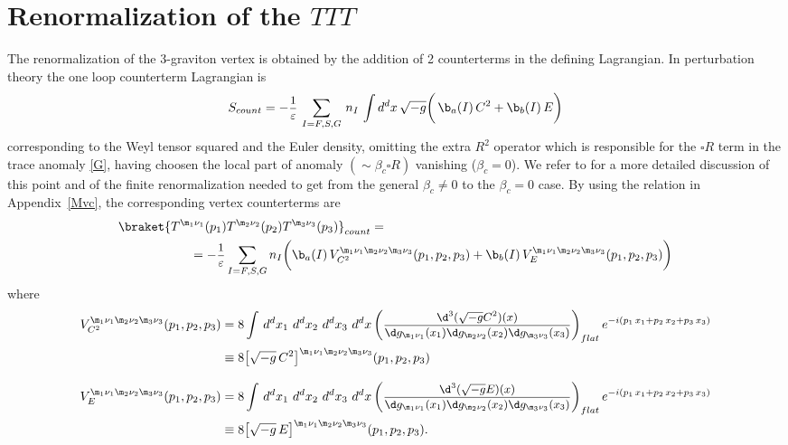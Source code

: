 \documentclass[a4paper,11pt,openright,twoside]{book}
\let\n=\nu      \let\x=\xi     \let\p=\pi      \let\r=\rho
\newcommand{\sdfrac}[2]{\mbox{\small$\displaystyle\frac{#1}{#2}$}}
\newcommand{\appref}[1]{Appendix~\ref{#1}}		%
\numberwithin{equation}{section}
\begin{document}
{{\section{Renormalization of the $TTT$}
\label{renorm}
The renormalization of the 3-graviton vertex is obtained by the addition of 2 counterterms in the defining Lagrangian. In perturbation theory the one loop counterterm Lagrangian is
\begin{equation}
	S_{count}=-\sdfrac{1}{\varepsilon}\,\sum_{I=F,S,G}\,n_I\,\int d^dx\,\sqrt{-g}\bigg(\,\b_a(I)\,C^2+\b_b(I)\,E\bigg)
	\label{scount}
\end{equation}
corresponding to the Weyl tensor squared and the Euler density, omitting the extra 
$R^2$ operator which is responsible for the $\square R$ term in the trace anomaly \eqref{G}, having choosen the local part of anomaly 
$(\sim \beta_c\square R)$ vanishing ($\beta_c=0$). We refer to \cite{Coriano:2012wp} for a more detailed discussion of this point and of the finite renormalization needed to get from the general $\beta_c\neq 0$ to the $\beta_c=0$ case. By using the relation in \appref{Mvc}, the corresponding vertex counterterms are
\begin{align}
	&\braket{T^{\m_1\n_1}(p_1)T^{\m_2\n_2}(p_2)T^{\m_3\n_3}(p_3)}_{count}=\notag\\
	&\hspace{2cm}=-\sdfrac{1}{\varepsilon}\sum_{I=F,S,G}n_I\bigg(\b_a(I)\,V_{C^2}^{\m_1\n_1\m_2\n_2\m_3\n_3}(p_1,p_2,p_3)+\b_b(I)\,V_{E}^{\m_1\n_1\m_2\n_2\m_3\n_3}(p_1,p_2,p_3)\bigg)
\end{align} 
where
\begin{align}
	V_{C^2}^{\m_1\n_1\m_2\n_2\m_3\n_3}(p_1,p_2,p_3)&=8\int\,d^dx_1\,\,d^dx_2\,\,d^dx_3\,\,d^dx\,\bigg(\sdfrac{\d^3(\sqrt{-g}C^2)(x)}{\d g_{\m_1\n_1}(x_1)\d g_{\m_2\n_2}(x_2)\d g_{\m_3\n_3}(x_3)}\bigg)_{flat}\,e^{-i(p_1\,x_1+p_2\,x_2+p_3\,x_3)}\notag\\
	&\equiv 8\big[\sqrt{-g}\,C^2\big]^{\m_1\n_1\m_2\n_2\m_3\n_3}(p_1,p_2,p_3)\\[2ex]
	V_{E}^{\m_1\n_1\m_2\n_2\m_3\n_3}(p_1,p_2,p_3)&=8\int\,d^dx_1\,\,d^dx_2\,\,d^dx_3\,\,d^dx\,\bigg(\sdfrac{\d^3(\sqrt{-g}E)(x)}{\d g_{\m_1\n_1}(x_1)\d g_{\m_2\n_2}(x_2)\d g_{\m_3\n_3}(x_3)}\bigg)_{flat}\,e^{-i(p_1\,x_1+p_2\,x_2+p_3\,x_3)}\notag\\
	&\equiv 8\big[\sqrt{-g}\,E\big]^{\m_1\n_1\m_2\n_2\m_3\n_3}(p_1,p_2,p_3).\label{count}
\end{align}

}}
\end{document}
